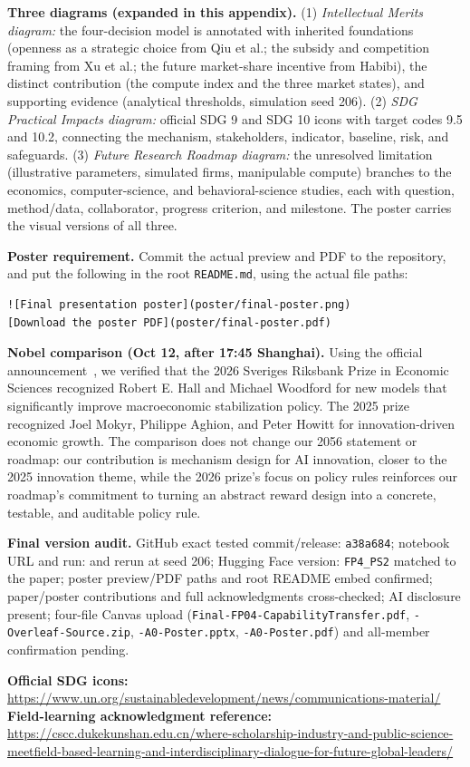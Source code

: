 \textbf{Three diagrams (expanded in this appendix).} (1) \emph{Intellectual Merits diagram:} the four-decision model is annotated with inherited foundations (openness as a strategic choice from Qiu et al.; the subsidy and competition framing from Xu et al.; the future market-share incentive from Habibi), the distinct contribution (the compute index and the three market states), and supporting evidence (analytical thresholds, simulation seed 206). (2) \emph{SDG Practical Impacts diagram:} official SDG 9 and SDG 10 icons with target codes 9.5 and 10.2, connecting the mechanism, stakeholders, indicator, baseline, risk, and safeguards. (3) \emph{Future Research Roadmap diagram:} the unresolved limitation (illustrative parameters, simulated firms, manipulable compute) branches to the economics, computer-science, and behavioral-science studies, each with question, method/data, collaborator, progress criterion, and milestone. The poster carries the visual versions of all three.

\textbf{Poster requirement.} Commit the actual preview and PDF to the repository, and put the following in the root \texttt{README.md}, using the actual file paths:
\begin{verbatim}
![Final presentation poster](poster/final-poster.png)
[Download the poster PDF](poster/final-poster.pdf)
\end{verbatim}

\textbf{Nobel comparison (Oct 12, after 17:45 Shanghai).} Using the official announcement~\cite{nobel2026}, we verified that the 2026 Sveriges Riksbank Prize in Economic Sciences recognized Robert E. Hall and Michael Woodford for new models that significantly improve macroeconomic stabilization policy. The 2025 prize~\cite{nobel2025} recognized Joel Mokyr, Philippe Aghion, and Peter Howitt for innovation-driven economic growth. The comparison does not change our 2056 statement or roadmap: our contribution is mechanism design for AI innovation, closer to the 2025 innovation theme, while the 2026 prize's focus on policy rules reinforces our roadmap's commitment to turning an abstract reward design into a concrete, testable, and auditable policy rule.

\textbf{Final version audit.} GitHub exact tested commit/release: \texttt{a38a684}; notebook URL and run:  and  rerun at seed 206; Hugging Face version: \texttt{FP4\_PS2} matched to the paper; poster preview/PDF paths and root README embed confirmed; paper/poster contributions and full acknowledgments cross-checked; AI disclosure present; four-file Canvas upload (\texttt{Final-FP04-CapabilityTransfer.pdf}, \texttt{-Overleaf-Source.zip}, \texttt{-A0-Poster.pptx}, \texttt{-A0-Poster.pdf}) and all-member confirmation pending.

\textbf{Official SDG icons:} \url{https://www.un.org/sustainabledevelopment/news/communications-material/}\\
\textbf{Field-learning acknowledgment reference:} \url{https://cscc.dukekunshan.edu.cn/where-scholarship-industry-and-public-science-meetfield-based-learning-and-interdisciplinary-dialogue-for-future-global-leaders/}
